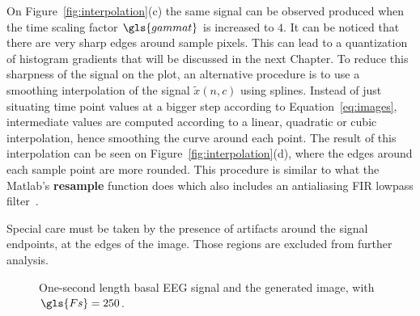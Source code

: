 On Figure~\ref{fig:interpolation}(c) the same signal can be observed produced when the time scaling factor $\gls{gammat}$ is increased to $4$. It can be noticed that there are very sharp edges around sample pixels.  This can lead to a quantization of histogram gradients that will be discussed in the next Chapter. To reduce this sharpness of the signal on the plot, an alternative procedure is to use a smoothing interpolation of the signal $\tilde{x}(n,c)$ using splines.  Instead of just situating time point values at a bigger step according to Equation~\ref{eq:images}, intermediate values are computed according to a linear, quadratic or cubic interpolation, hence smoothing the curve around each point.  The result of this interpolation can be seen on Figure~\ref{fig:interpolation}(d), where the edges around each sample point are more rounded. This procedure is similar to what the Matlab's \textbf{resample} function does which also includes an antialiasing FIR lowpass filter~\cite{Oppenheim2009}.

Special care must be taken by the presence of artifacts around the signal endpoints, at the edges of the image. Those regions are excluded from further analysis.

\begin{figure}[htb]
\centering
{}
\caption[Signal and Plot]{One-second length basal EEG signal and the generated image, with $\gls{Fs} = 250$. }
\label{fig:plotvsimage}
\end{figure}

